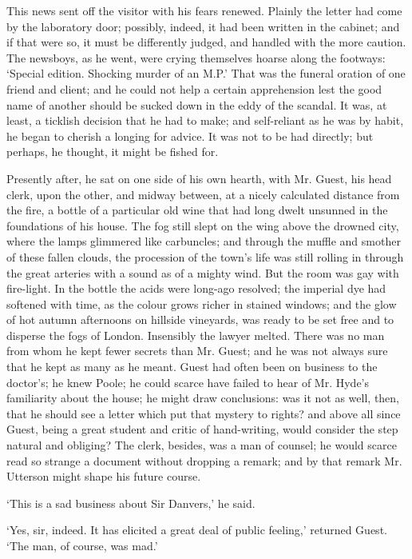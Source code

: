 \documentclass[]{novel}
\begin{document}
This news sent off the visitor with his fears renewed. Plainly the letter had come by the laboratory door; possibly, indeed, it had been written in the cabinet; and if that were so, it must be differently judged, and handled with the more caution. The newsboys, as he went, were crying themselves hoarse along the footways: ‘Special edition. Shocking murder of an M.P.’ That was the funeral oration of one friend and client; and he could not help a certain apprehension lest the good name of another should be sucked down in the eddy of the scandal. It was, at least, a ticklish decision that he had to make; and self-reliant as he was by habit, he began to cherish a longing for advice. It was not to be had directly; but perhaps, he thought, it might be fished for.

Presently after, he sat on one side of his own hearth, with Mr. Guest, his head clerk, upon the other, and midway between, at a nicely calculated distance from the fire, a bottle of a particular old wine that had long dwelt unsunned in the foundations of his house. The fog still slept on the wing above the drowned city, where the lamps glimmered like carbuncles; and through the muffle and smother of these fallen clouds, the procession of the town’s life was still rolling in through the great arteries with a sound as of a mighty wind. But the room was gay with fire-light. In the bottle the acids were long-ago resolved; the imperial dye had softened with time, as the colour grows richer in stained windows; and the glow of hot autumn afternoons on hillside vineyards, was ready to be set free and to disperse the fogs of London. Insensibly the lawyer melted. There was no man from whom he kept fewer secrets than Mr. Guest; and he was not always sure that he kept as many as he meant. Guest had often been on business to the doctor’s; he knew Poole; he could scarce have failed to hear of Mr. Hyde’s familiarity about the house; he might draw conclusions: was it not as well, then, that he should see a letter which put that mystery to rights? and above all since Guest, being a great student and critic of hand-writing, would consider the step natural and obliging? The clerk, besides, was a man of counsel; he would scarce read so strange a document without dropping a remark; and by that remark Mr. Utterson might shape his future course.

‘This is a sad business about Sir Danvers,’ he said.

‘Yes, sir, indeed. It has elicited a great deal of public feeling,’ returned Guest. ‘The man, of course, was mad.’
\end{document}
